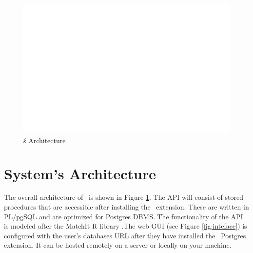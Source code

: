 
\begin{figure}
 \includegraphics[scale=0.2]{Figures/dummy.png}
 \caption{\GSQLB\'s Architecture}
  \label{fig:arch}
  \vspace{-3mm}
\end{figure}

\section{System's Architecture}
The overall architecture of \GSQL\ is shown in Figure \ref{fig:arch}. The API will consist of stored procedures that are accessible after installing the \GSQL\ extension.
These are written in PL/pgSQL and are optimized for Postgres DBMS.
The functionality of the API is modeled after the MatchIt R library \cite{ho2005}.The web GUI (see Figure \ref{fig:inteface}) is configured with the user's databases URL after they have installed the \GSQL\ Postgres extension.
It can be hosted remotely on a server or locally on your machine. 
